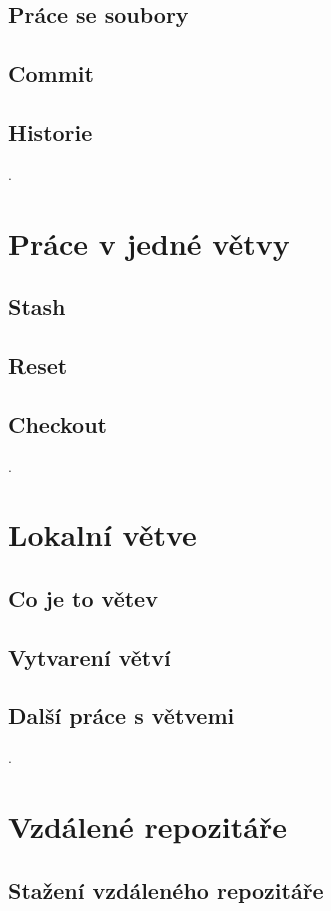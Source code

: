 \documentclass[11pt]{article}
\begin{document}
\subsection{Práce se soubory}
\subsection{Commit}
\subsection{Historie}

.

\section{Práce v jedné větvy}
\subsection{Stash}
\subsection{Reset}
\subsection{Checkout}

.

\section{Lokalní větve}
\subsection{Co je to větev}
\subsection{Vytvarení větví}
\subsection{Další práce s větvemi}

.

\section{Vzdálené repozitáře}
\subsection{Stažení vzdáleného repozitáře}
\end{document}
